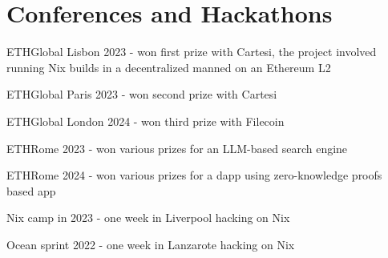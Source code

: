 \documentclass[]{cv}
\begin{document}
\begin{minipage}[t]{0.60\textwidth}
\section{Conferences and Hackathons}
\begin{tightemize}
\item ETHGlobal Lisbon 2023 - won first prize with Cartesi, the project involved running Nix builds in a decentralized manned on an Ethereum L2
\item ETHGlobal Paris 2023 - won second prize with Cartesi 
\item ETHGlobal London 2024 - won third prize with Filecoin 
\item ETHRome 2023 - won various prizes for an LLM-based search engine
\item ETHRome 2024 - won various prizes for a dapp using zero-knowledge proofs based app
\item Nix camp in 2023 - one week in Liverpool hacking on Nix
\item Ocean sprint 2022 - one week in Lanzarote hacking on Nix
\end{tightemize}
\sectionsep

\end{minipage}
\hfill
\end{document}
